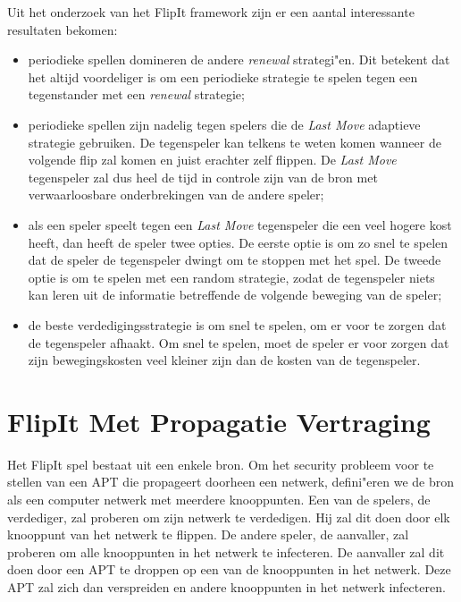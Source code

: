 \documentclass[master=cws, masteroption=vs,english]{kulemt}
\begin{document}
\begin{abstract*}
Uit het onderzoek van het FlipIt framework zijn er een aantal interessante resultaten bekomen:
\begin{itemize}
\item periodieke spellen domineren de andere \textit{renewal }strategi"en. Dit betekent dat het altijd voordeliger is om een periodieke strategie te spelen tegen een tegenstander met een \textit{renewal} strategie;
\item periodieke spellen zijn nadelig tegen spelers die de\textit{ Last Move} adaptieve strategie gebruiken. De tegenspeler kan telkens te weten komen wanneer de volgende flip zal komen en juist erachter zelf flippen. De \textit{Last Move} tegenspeler zal dus heel de tijd in controle zijn van de bron met verwaarloosbare onderbrekingen van de andere speler;
\item als een speler speelt tegen een \textit{Last Move} tegenspeler die een veel hogere kost heeft, dan heeft de speler twee opties. De eerste optie is om zo snel te spelen dat de speler de tegenspeler dwingt om te stoppen met het spel. De tweede optie is om te spelen met een random strategie, zodat de tegenspeler niets kan leren uit de informatie betreffende de volgende beweging van de speler;
\item de beste verdedigingsstrategie is om snel te spelen, om er voor te zorgen dat de tegenspeler afhaakt. Om snel te spelen, moet de speler er voor zorgen dat zijn bewegingskosten veel kleiner zijn dan de kosten van de tegenspeler.
\end{itemize}


\section {FlipIt Met Propagatie Vertraging}
\label{ch: flipitvirus}
Het FlipIt spel bestaat uit een enkele bron. Om het security probleem voor te stellen van een APT die propageert doorheen een netwerk, defini"eren we de bron als een computer netwerk met meerdere knooppunten. Een van de spelers, de verdediger, zal proberen om zijn netwerk te verdedigen. Hij zal dit doen door elk knooppunt van het netwerk te flippen. De andere speler, de aanvaller, zal proberen om alle knooppunten in het netwerk te infecteren. De aanvaller zal dit doen door een APT te droppen op een van de knooppunten in het netwerk. Deze APT zal zich dan verspreiden en andere knooppunten in het netwerk infecteren. \\


\end{abstract*}
\end{document}
